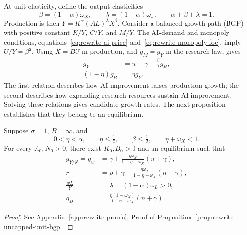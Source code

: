 At unit elasticity, define the output elasticities
\begin{equation}
 \beta=(1-\alpha)\omega_X,\qquad
 \lambda=(1-\alpha)\omega_L,
 \qquad\alpha+\beta+\lambda=1.
 \label{eq:rewrite-uncapped-unit-elasticities}
\end{equation}
Production is then $Y=K^\alpha(AL)^\lambda X^\beta$.
Consider a balanced-growth path (BGP) with positive constant $K/Y$, $C/Y$,
and $M/Y$. The AI-demand and
monopoly conditions, equations~\eqref{eq:rewrite-ai-price}
and~\eqref{eq:rewrite-monopoly-foc}, imply $U/Y=\beta^2$.
Using $X=BU$ in production, and $g_M=g_Y$ in the research law, gives
\begin{align}
 g_Y&=n+\gamma+\frac{\beta}{\lambda}g_B,
 \label{eq:rewrite-uncapped-unit-production-growth}\\
 (1-\eta)g_B&=\eta g_Y.
 \label{eq:rewrite-uncapped-unit-research-growth}
\end{align}
The first relation describes how AI improvement raises production growth;
the second describes how expanding research resources sustain AI improvement.
Solving these relations gives candidate growth rates. The next proposition
establishes that they belong to an equilibrium.

\begin{proposition}
\label{prop:rewrite-uncapped-unit-bgp}
Suppose $\sigma=1$, $\overline B=\infty$, and
\begin{equation}
 0<\eta<\alpha,\qquad \eta\leq\tfrac12,\qquad
 \beta\leq\tfrac12,\qquad \eta+\omega_X<1.
 \label{eq:rewrite-uncapped-unit-sufficient}
\end{equation}
For every $A_0,N_0>0$, there exist $K_0,B_0>0$ and an equilibrium such that
\begin{align}
 g_{Y/N}=g_w& =\gamma+\frac{\eta\omega_X}{1-\eta-\omega_X}(n+\gamma),
 \label{eq:rewrite-uncapped-unit-wage-growth}\\
 r&=\rho+\gamma+\frac{\eta\omega_X}{1-\eta-\omega_X}(n+\gamma),
 \label{eq:rewrite-uncapped-unit-return}\\
 \frac{wL}{Y}&=\lambda=(1-\alpha)\omega_L>0,
 \label{eq:rewrite-uncapped-unit-labor-share}\\
 g_B&=\frac{\eta(1-\omega_X)}{1-\eta-\omega_X}(n+\gamma).
 \label{eq:rewrite-uncapped-unit-efficiency-growth}
\end{align}
\end{proposition}
\begin{proof}
See Appendix~\ref{app:rewrite-proofs},
\hyperref[proof:rewrite-uncapped-unit-bgp]{Proof of
Proposition~\ref*{prop:rewrite-uncapped-unit-bgp}}.
\end{proof}

